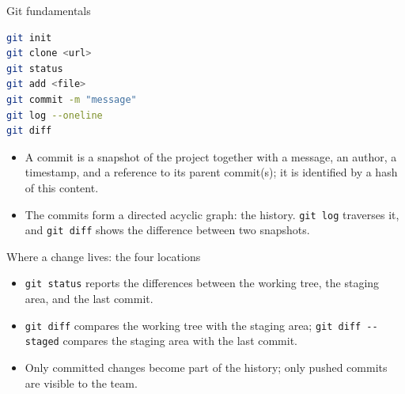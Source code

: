 \begin{frame}[fragile]{Git fundamentals}
\begin{lstlisting}[style=coursepython,language=bash]
git init
git clone <url>
git status
git add <file>
git commit -m "message"
git log --oneline
git diff
\end{lstlisting}
\begin{itemize}
\item A commit is a snapshot of the project together with a message, an author, a timestamp, and a reference to its parent commit(s); it is identified by a hash of this content.
\item The commits form a directed acyclic graph: the history. \texttt{git log} traverses it, and \texttt{git diff} shows the difference between two snapshots.
\end{itemize}
\coursefooter
\end{frame}

\begin{frame}{Where a change lives: the four locations}
\centering
{}
\vspace{0.6em}
\begin{itemize}\footnotesize
\item \texttt{git status} reports the differences between the working tree, the staging area, and the last commit.
\item \texttt{git diff} compares the working tree with the staging area; \texttt{git diff -{}-staged} compares the staging area with the last commit.
\item Only committed changes become part of the history; only pushed commits are visible to the team.
\end{itemize}
\coursefooter
\end{frame}

